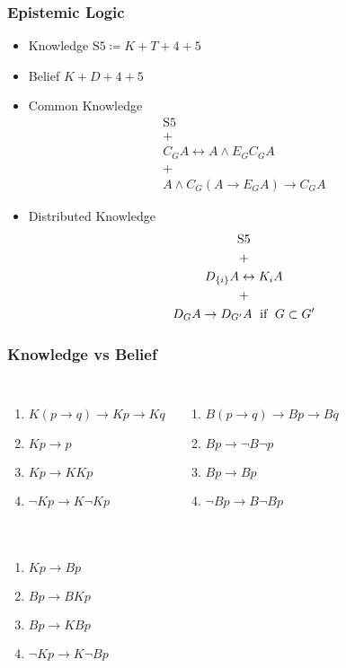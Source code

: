 \documentclass[UTF8,aspectratio=43,11pt,colorlinks,compress,openany]{beamer}%
\begin{document}
\begin{frame}\frametitle{Epistemic Logic}
\setlength\abovedisplayskip{0pt}
\setlength\belowdisplayskip{0pt}
\begin{itemize}
	\item Knowledge $\mathrm{S5}\coloneqq K+T+4+5$\\
	\begin{center}
	\end{center}
	\item Belief $K+D+4+5$
	\item Common Knowledge\vspace{-2ex}
	\begin{gather*}
	\mathrm{S5}\\
	+\\
	C_G A\leftrightarrow A\wedge E_GC_G A\\
	+\\
	A\wedge C_G(A\to E_G A)\to C_G A
	\end{gather*}
	\item Distributed Knowledge\vspace{-1ex}
	\begin{gather*}
	\mathrm{S5}\\
	+\\
	D_{\{i\}}A\leftrightarrow K_i A\\
	+\\
	D_G A\to D_{G'} A \mbox{\; if \;} G\subset G'
	\end{gather*}
\end{itemize}
\end{frame}

\begin{frame}\frametitle{Knowledge vs Belief}
\begin{columns}
\begin{enumerate}
	\item $K(p\to q)\to Kp\to Kq$
	\item $Kp\to p$
	\item $Kp\to KKp$
	\item $\neg Kp\to K\neg Kp$
\end{enumerate}
\begin{enumerate}
	\item $B(p\to q)\to Bp\to Bq$
	\item $Bp\to\neg B\neg p$
	\item $Bp\to Bp$
	\item $\neg Bp\to B\neg Bp$
\end{enumerate}
\end{columns}
\begin{columns}
\begin{enumerate}
	\item $Kp\to Bp$
	\item $Bp\to BKp$
	\item $Bp\to KBp$
	\item $\neg Kp\to K\neg Bp$
\end{enumerate}
\centerline{}
\end{columns}
\end{frame}
\end{document}
